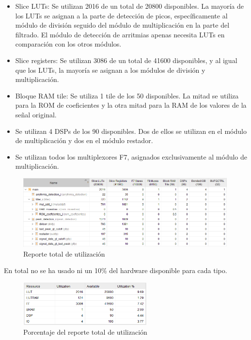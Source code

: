 \begin{itemize}
    \item Slice LUTs: Se utilizan 2016 de un total de 20800 disponibles. La mayoría de los LUTs se asignan a la parte de detección de picos, específicamente al módulo de división seguido del módulo de multiplicación en la parte del filtrado. El módulo de detección de arritmias apenas necesita LUTs en comparación con los otros módulos.
    \item Slice registers: Se utilizan 3086 de un total de 41600 disponibles, y al igual que los LUTs, la mayoría se asignan a los módulos de división y multiplicación.
    \item Bloque RAM tile: Se utiliza 1 tile de los 50 disponibles. La mitad se utiliza para la ROM de coeficientes y la otra mitad para la RAM de los valores de la señal original.
    \item Se utilizan 4 DSPs de los 90 disponibles. Dos de ellos se utilizan en el módulo de multiplicación y dos en el módulo restador.
    \item Se utilizan todos los multiplexores F7, asignados exclusivamente al módulo de multiplicación.
\end{itemize}


\begin{figure}[h]
	\centering
	\includegraphics[width=0.99\textwidth]{./Images/img_res_experimentales/utilization1.png}
	\caption{Reporte total de utilización}
	\label{fig:utilization1}
\end{figure}

En total no se ha usado ni un 10\% del hardware disponible para cada tipo.
\begin{figure}[h]
	\centering
	\includegraphics[width=0.6\textwidth]{./Images/img_res_experimentales/utilization2.png}
	\caption{Porcentaje del reporte total de utilización}
	\label{fig:utilization2}
\end{figure}

